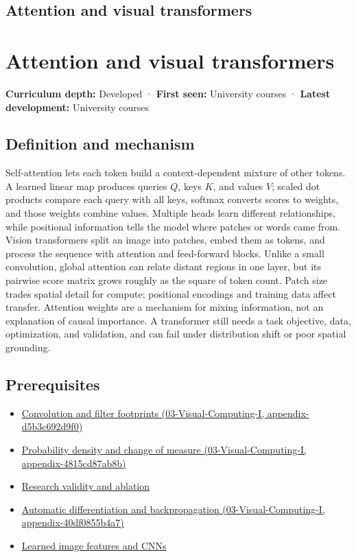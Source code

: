 \hypertarget{appendix-a9d5dfdd164a}{}
\section*{Attention and visual transformers}
\chapter{Attention and visual transformers}\label{appendix-a9d5dfdd164a-attention-and-visual-transformers}

\textbf{Curriculum depth:} Developed · \textbf{First seen:} University courses · \textbf{Latest development:} University courses

\section{Definition and mechanism}\label{appendix-a9d5dfdd164a-definition-and-mechanism}

Self-attention lets each token build a context-dependent mixture of other tokens. A learned linear map produces queries \(Q\), keys \(K\), and values \(V\); scaled dot products compare each query with all keys, softmax converts scores to weights, and those weights combine values. Multiple heads learn different relationships, while positional information tells the model where patches or words came from. Vision transformers split an image into patches, embed them as tokens, and process the sequence with attention and feed-forward blocks. Unlike a small convolution, global attention can relate distant regions in one layer, but its pairwise score matrix grows roughly as the square of token count. Patch size trades spatial detail for compute; positional encodings and training data affect transfer. Attention weights are a mechanism for mixing information, not an explanation of causal importance. A transformer still needs a task objective, data, optimization, and validation, and can fail under distribution shift or poor spatial grounding.

\section{Prerequisites}\label{appendix-a9d5dfdd164a-prerequisites}

\begin{itemize}
\tightlist
\item
  \href{../03-Visual-Computing-I/main.pdf\#nameddest=appendix-d5b3c692d9f0}{Convolution and filter footprints (03-Visual-Computing-I, appendix-d5b3c692d9f0)}
\item
  \href{../03-Visual-Computing-I/main.pdf\#nameddest=appendix-4815cd87ab8b}{Probability density and change of measure (03-Visual-Computing-I, appendix-4815cd87ab8b)}
\item
  \hyperref[appendix-65788587ef78]{Research validity and ablation}
\item
  \href{../03-Visual-Computing-I/main.pdf\#nameddest=appendix-40df0855b4a7}{Automatic differentiation and backpropagation (03-Visual-Computing-I, appendix-40df0855b4a7)}
\item
  \hyperref[appendix-47c51ea026fb]{Learned image features and CNNs}
\end{itemize}

